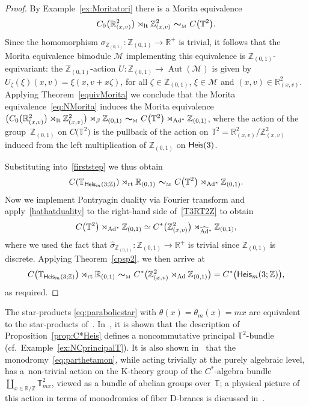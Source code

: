 \documentclass[pdftex]{sigma}
\numberwithin{equation}{section}
\newcommand{\Z}{\zed}
\newcommand{\mbf}[1]{{\boldsymbol {#1} }}
\newcommand{\Aut}{\operatorname{Aut}}
\newcommand{\Heis}{{\sf Heis}}
\newcommand{\lt}{{\rm lt}}
\newcommand{\rt}{{\rm rt}}
\newcommand{\R}{\real}
\newcommand{\zed}{{\mathbb Z}} %
\newcommand{\real}{{\mathbb R}} %
\newcommand{\torus}{{\mathbb T}} %
\def\Mcal{{\mathcal M}}
\begin{document}
\begin{proof}
By Example~\ref{ex:Moritatori} there is a Morita equivalence
\begin{gather}\label{eq:NMorita}
C_0\big(\real_{(x,v)}^2\big)\rtimes_{\lt} \Z_{(x,v)}^2 \ \mbf\sim_{\text{\tiny M}} \
C\big(\torus^2\big) .
\end{gather}
Since the homomorphism
$\sigma_{\Z_{(0,1)}}\colon \Z_{(0,1)}\to\real^+$ is trivial, it follows
that the Morita equivalence bimodule $\Mcal$ implementing this
equivalence is $\Z_{(0,1)}$-equivariant:
the $\Z_{(0,1)}$-action
$U\colon \Z_{(0,1)}\rightarrow \Aut(\Mcal)$ is given by $U_\zeta(\xi)(x,v)=\xi(x,v+x \zeta)$, for all $\zeta\in
\Z_{(0,1)}$, $\xi\in \Mcal$ and $(x,v)\in \real_{(x,v)}^2 $.
Applying Theorem~\ref{equivMorita} we conclude that the
Morita equivalence~\eqref{eq:NMorita} induces the Morita equivalence
$\big(C_0\big(\real_{(x,v)}^2 \big)\rtimes_{\lt}
\Z_{(x,v)}^2\big) \rtimes_\beta \Z_{(0,1)}\
\mbf\sim_{\text{\tiny M}}\ C\big(\torus^2 \big) \rtimes_{{\rm Ad}^*} \Z_{(0,1)}$, where the action
of the group~$\Z_{(0,1)}$ on $C\big(\torus^2\big)$ is the pullback of the action on
$\torus^2=\real_{(x,v)}^2/\Z_{(x,v)}^2$ induced from the left
multiplication of $\Z_{(0,1)}$ on $\Heis(3)$.

Substituting into~\eqref{firststep} we thus obtain
\begin{gather}\label{T3RT2Z}
C(\torus_{\Heis_m(3;\Z)})\rtimes_\rt\real_{(0,1)} \ \mbf\sim_{\text{\tiny M}} \
C\big(\torus^2 \big) \rtimes_{{\rm Ad}^*} \Z_{(0,1)} .
\end{gather}
Now we implement Pontryagin duality via Fourier transform and apply~\eqref{hathatduality} to the right-hand side of~\eqref{T3RT2Z} to
obtain
\[
C\big(\torus^2\big)\rtimes_{{\rm Ad}^*}\Z_{(0,1)} \simeq
C^*\big(\Z_{(x,v)}^2\big)\rtimes_{\widehat{\rm Ad}{}^*} \Z_{(0,1)} ,
\]
where we used the fact that $\widehat\sigma_{\Z_{(0,1)}}\colon \Z_{(0,1)}\to\real^+$ is
trivial since $\Z_{(0,1)}$ is discrete. Applying
Theorem~\ref{cpsp2}, we then arrive at
\[
C\big(\torus_{\Heis_m(3;\Z)}\big)\rtimes_\rt\real_{(0,1)} \
\mbf\sim_{\text{\tiny M}} \
C^*\big(\Z_{(x,v)}^2\rtimes_{\rm
 Ad}\Z_{(0,1)}\big) = C^*\big(\Heis_m(3;\Z)\big) ,
\]
as required.
\end{proof}

\begin{Remark}
The star-products \eqref{eq:parabolicstar} with
$\theta(x)=\theta_m(x)=m x$ are equivalent to the star-products
of~\cite{Hannabuss2010,Hull2019, Lowe2003}. In~\cite{Echterhoff2009,Hannabuss2010},
it is shown that the description of Proposition~\ref{prop:C*Heis}
defines a noncommutative principal $\torus^2$-bundle
(cf.\ Example~\ref{ex:NCprincipalT}). It is also shown
in~\cite{Echterhoff2009} that the monodromy~\eqref{eq:parthetamon},
while acting trivially at the purely algebraic level, has a~non-trivial action on the K-theory group of the $C^*$-algebra
bundle $\coprod_{x\in\R/\Z} \torus_{m x}^2$, viewed as a bundle of
abelian groups over~$\torus$; a physical picture of this action in
terms of monodromies of fiber D-branes is
discussed in~\cite{Hull2019}.
\end{Remark}
\end{document}
